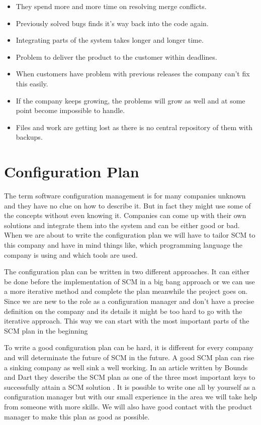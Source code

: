\documentclass[a4paper,11pt]{article}
\begin{document}
\begin{itemize}
\item They spend more and more time on resolving merge conflicts.
\item Previously solved bugs finds it’s way back into the code again.
\item Integrating parts of the system takes longer and longer time.
\item Problem to deliver the product to the customer within deadlines.
\item When customers have problem with previous releases the company can't fix this easily.
\item If the company keeps growing, the problems will grow as well and at some point become impossible to handle.
\item Files and work are getting lost as there is no central repository of them with backups.
\end{itemize}



\section{Configuration Plan}


The term software configuration management is for many companies unknown and they have no clue on how to describe it.
But in fact they might use some of the concepts without even knowing
it. Companies can come up with their own solutions and integrate them into the
system and can be either good or bad. When we are about to write the
configuration plan we will have to tailor SCM to this company and have in mind
things like, which programming language the company is using and which tools are
used.

The configuration plan can be written in two different approaches.
\cite{SCMPLAN} It can either be done before the implementation of SCM in a big
bang approach or we can use a more iterative method and complete the plan
meanwhile the project goes on. Since we are new to the role as a configuration
manager and don’t have a precise definition on the company and its details it
might be too hard to go with the iterative approach. This way we can start with
the most important parts of the SCM plan in the beginning

To write a good configuration plan can be hard, it is different for every
company and will determinate the future of SCM in the future. A good SCM plan
can rise a sinking company as well sink a well working. In an article written by
Bounds and Dart they describe the SCM plan as one of the three most important
keys to successfully attain a SCM solution \cite{BoundsDart}. It is possible to
write one all by yourself as a configuration manager but with our small
experience in the area we will take help from someone with more skills. We will
also have good contact with the product manager to make this plan as good as
possible.
\end{document}
